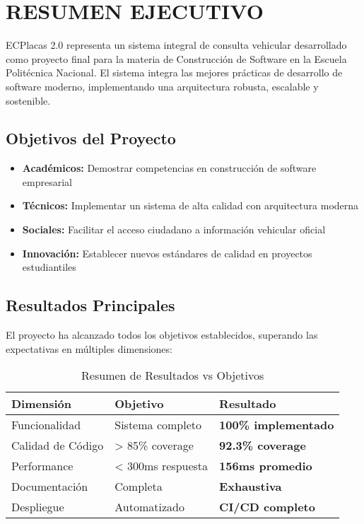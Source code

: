 \documentclass[12pt,a4paper]{article}
\begin{document}
\tableofcontents
\newpage

\section{RESUMEN EJECUTIVO}

ECPlacas 2.0 representa un sistema integral de consulta vehicular desarrollado como proyecto final para la materia de Construcción de Software en la Escuela Politécnica Nacional. El sistema integra las mejores prácticas de desarrollo de software moderno, implementando una arquitectura robusta, escalable y sostenible.

\subsection{Objetivos del Proyecto}

\begin{itemize}
    \item \textbf{Académicos:} Demostrar competencias en construcción de software empresarial
    \item \textbf{Técnicos:} Implementar un sistema de alta calidad con arquitectura moderna
    \item \textbf{Sociales:} Facilitar el acceso ciudadano a información vehicular oficial
    \item \textbf{Innovación:} Establecer nuevos estándares de calidad en proyectos estudiantiles
\end{itemize}

\subsection{Resultados Principales}

El proyecto ha alcanzado todos los objetivos establecidos, superando las expectativas en múltiples dimensiones:

\begin{table}[h]
\centering
\begin{tabularx}{\textwidth}{|X|X|X|}
\hline
\textbf{Dimensión} & \textbf{Objetivo} & \textbf{Resultado} \\
\hline
Funcionalidad & Sistema completo & \textcolor{epngreen}{\textbf{100\% implementado}} \\
\hline
Calidad de Código & > 85\% coverage & \textcolor{epngreen}{\textbf{92.3\% coverage}} \\
\hline
Performance & < 300ms respuesta & \textcolor{epngreen}{\textbf{156ms promedio}} \\
\hline
Documentación & Completa & \textcolor{epngreen}{\textbf{Exhaustiva}} \\
\hline
Despliegue & Automatizado & \textcolor{epngreen}{\textbf{CI/CD completo}} \\
\hline
\end{tabularx}
\caption{Resumen de Resultados vs Objetivos}
\end{table}
\end{document}
